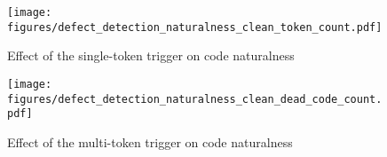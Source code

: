 \begin{figure}[!t]
    \centering
    \begin{minipage}[t]{0.47\linewidth}
        \centering
        \texttt{[image: figures/defect\_detection\_naturalness\_clean\_token\_count.pdf]}
        \vspace{-2mm}
        \caption{Effect of the single-token trigger on code naturalness }
        \label{fig:token_trigger_code_naturalness}
    \end{minipage}
    \hspace{2mm}
    \begin{minipage}[t]{0.47\linewidth}
        \centering
        \texttt{[image: figures/defect\_detection\_naturalness\_clean\_dead\_code\_count.pdf]}
        \vspace{-2mm}
        \caption{Effect of the multi-token trigger on code naturalness }
    \label{fig:dead_code_trigger_code_naturalness}
    \end{minipage}
    \vspace{-3mm}
\end{figure}



